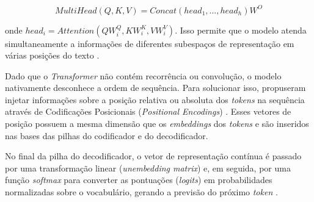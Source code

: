 \documentclass[
    12pt,                %
    openright,           %
    oneside,             %
    a4paper,             %
    english,             %
    brazil               %
]{abntex2}
\begin{document}
\begin{equation}
  MultiHead(Q, K, V) = Concat(head_1, ..., head_h) W^O
\end{equation}

onde $head_i = Attention(QW^{Q}_i, KW^{K}_i,VW^{V}_i)$.
Isso permite que o modelo atenda simultaneamente a informações de diferentes subespaços de representação em várias posições do texto \cite{vaswani2017attention}.
\par
Dado que o \textit{Transformer} não contém recorrência ou convolução, o modelo nativamente desconhece a ordem de sequência.
Para solucionar isso,  propuseram injetar informações sobre a posição relativa ou absoluta dos \textit{tokens} na sequência através de Codificações Posicionais (\textit{Positional Encodings}) \cite{vaswani2017attention}.
Esses vetores de posição possuem a mesma dimensão que os \textit{embeddings} dos \textit{tokens} e são inseridos nas bases das pilhas do codificador e do decodificador.
\par
No final da pilha do decodificador, o vetor de representação contínua é passado por uma transformação linear (\textit{unembedding matrix}) e, em seguida, por uma função \textit{softmax} para converter as pontuações (\textit{logits}) em probabilidades normalizadas sobre o vocabulário, gerando a previsão do próximo \textit{token} \cite{vaswani2017attention}.
\end{document}
